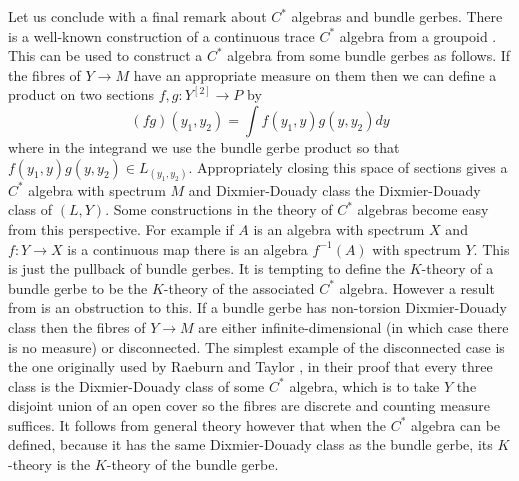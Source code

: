 \documentclass[a4paper,reqno]{amsart}
\theoremstyle{plain}
\theoremstyle{definition}
\theoremstyle{remark}
\numberwithin{equation}{section}
\numberwithin{figure}{section}
\newcommand{\<}{\langle}
\renewcommand{\>}{\rangle}
\begin{document}
Let us conclude with a final remark about $C^*$ algebras and bundle gerbes.
There is a well-known construction of a continuous
trace  $C^*$ algebra from
a groupoid \cite{Ren}.  This can be used to construct a $C^*$ algebra
from some bundle gerbes as follows.  If the fibres of
       $Y \to M$ have an appropriate measure on them then we can
define a product on two sections $f, g \colon  Y^{[2]} \to P$ by
$$
(fg)(y_1, y_2) = \int f(y_1, y)g(y, y_2) dy
$$
where in the integrand we use the bundle gerbe product so that
$f(y_1, y) g(y, y_2) \in L_{(y_1, y_2)}$.  Appropriately
closing this space of sections gives a $C^*$ algebra with spectrum $M$
and Dixmier-Douady class the Dixmier-Douady class of $(L, Y)$.
Some constructions in the theory of $C^*$ algebras become easy from this
perspective. For example if $A$ is an algebra with spectrum $X$ and
$f \colon Y \to X$
is a continuous map there is an algebra $f^{-1}(A)$ with spectrum $Y$.
This is just the pullback of bundle gerbes.  It is tempting to define
the $K$-theory of a bundle gerbe to be the $K$-theory of the
associated $C^*$ algebra.
However a result from \cite{Mur} is an obstruction to this. If a
bundle gerbe has non-torsion Dixmier-Douady class then the fibres of
$Y \to M$ are either infinite-dimensional (in which case there is no
measure) or disconnected. The simplest example of the disconnected
case is the one originally used by Raeburn and Taylor \cite{RaeTay},
in their proof that every three class is the Dixmier-Douady class of
some $C^*$ algebra, which is to take $Y$ the disjoint union of an
open cover so the fibres are discrete and counting measure
suffices. It follows from general theory however that when the $C^*$
algebra can be defined, because it has the same Dixmier-Douady class
as the bundle gerbe, its $K$-theory is the $K$-theory of the bundle
gerbe.
\end{document}
